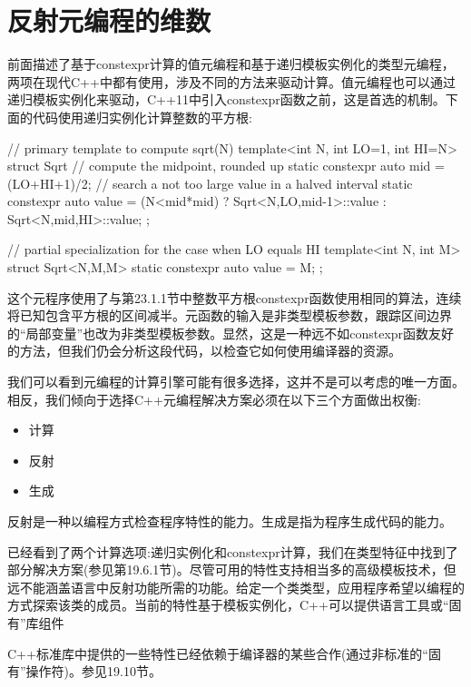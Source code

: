 \section{反射元编程的维数}
前面描述了基于constexpr计算的值元编程和基于递归模板实例化的类型元编程，两项在现代C++中都有使用，涉及不同的方法来驱动计算。值元编程也可以通过递归模板实例化来驱动，C++11中引入constexpr函数之前，这是首选的机制。下面的代码使用递归实例化计算整数的平方根:

\begin{cpp}
// primary template to compute sqrt(N)
template<int N, int LO=1, int HI=N>
struct Sqrt {
	// compute the midpoint, rounded up
	static constexpr auto mid = (LO+HI+1)/2;
	// search a not too large value in a halved interval
	static constexpr auto value = (N<mid*mid) ? Sqrt<N,LO,mid-1>::value
	: Sqrt<N,mid,HI>::value;
};

// partial specialization for the case when LO equals HI
template<int N, int M>
struct Sqrt<N,M,M> {
	static constexpr auto value = M;
};
\end{cpp}

这个元程序使用了与第23.1.1节中整数平方根constexpr函数使用相同的算法，连续将已知包含平方根的区间减半。元函数的输入是非类型模板参数，跟踪区间边界的“局部变量”也改为非类型模板参数。显然，这是一种远不如constexpr函数友好的方法，但我们仍会分析这段代码，以检查它如何使用编译器的资源。

我们可以看到元编程的计算引擎可能有很多选择，这并不是可以考虑的唯一方面。相反，我们倾向于选择C++元编程解决方案必须在以下三个方面做出权衡:

\begin{itemize}
\item 
计算

\item 
反射

\item 
生成
\end{itemize}

反射是一种以编程方式检查程序特性的能力。生成是指为程序生成代码的能力。

已经看到了两个计算选项:递归实例化和constexpr计算，我们在类型特征中找到了部分解决方案(参见第19.6.1节)。尽管可用的特性支持相当多的高级模板技术，但远不能涵盖语言中反射功能所需的功能。给定一个类类型，应用程序希望以编程的方式探索该类的成员。当前的特性基于模板实例化，C++可以提供语言工具或“固有”库组件

\begin{notice}
C++标准库中提供的一些特性已经依赖于编译器的某些合作(通过非标准的“固有”操作符)。参见19.10节。
\end{notice}

